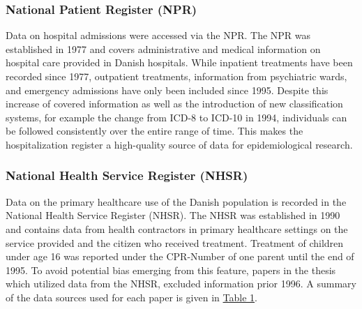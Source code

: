 
\subsubsection*{National Patient Register (NPR)}
Data on hospital admissions were accessed via the NPR. The NPR was established 
in 1977 and covers administrative and medical information on hospital care 
provided in Danish hospitals.\citep{schmidt2015danish} While inpatient 
treatments have been recorded since 1977, outpatient treatments, information 
from psychiatric wards, and emergency admissions have only been included 
since 1995.\citep{lynge2011} Despite this increase of covered information as 
well as the introduction of new classification systems, for example the change 
from ICD-8 to ICD-10 in 1994,\citep{munk1999implementation} individuals can 
be followed consistently over the entire range of time. This makes the 
hospitalization register a high-quality source of data for epidemiological 
research.\citep{lynge2011}\\


\subsubsection*{National Health Service Register (NHSR)}
Data on the primary healthcare use of the Danish population is recorded 
in the National Health Service Register (NHSR). The NHSR was established 
in 1990 and contains data from health contractors in primary healthcare 
settings on the service provided and the citizen who received treatment.\citep{thygesen2011} 
Treatment of children under age 16 was reported under the CPR-Number of 
one parent until the end of 1995.\citep{sahl2011danish} To avoid potential 
bias emerging from this feature, papers in the thesis which utilized data 
from the NHSR, excluded information prior 1996. A summary of the data 
sources used for each paper is given in \hyperref[ch1:tab1]{Table 1}.\\



